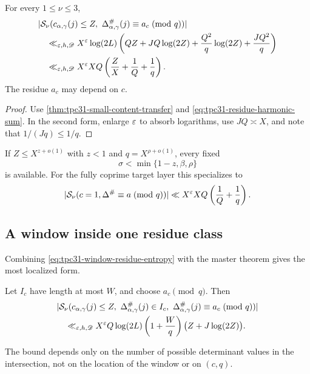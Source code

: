 \begin{corollary}
\label{cor:tpc31-small-residue}
For every $1\le\nu\le3$,
\begin{align}
 &|\mathcal S_\nu(c_{\alpha,\gamma}(j)\le Z,
 \ \Delta^\#_{\alpha,\gamma}(j)
       \equiv a_c\!\pmod q)|
 \notag\\
 &\quad\ll_{\varepsilon,h,\mathscr D}X^\varepsilon\log(2L)
 \left(
 QZ+JQ\log(2Z)
 +\frac{Q^2}q\log(2Z)+\frac{JQ^2}q
 \right)
 \label{eq:tpc31-small-residue-expanded}\\
 &\quad\ll_{\varepsilon,h,\mathscr D}
 X^\varepsilon XQ
 \left(\frac ZX+\frac1Q+\frac1q\right).
 \label{eq:tpc31-small-residue}
\end{align}
The residue $a_c$ may depend on $c$.
\end{corollary}

\begin{proof}
Use \cref{thm:tpc31-small-content-transfer} and
\eqref{eq:tpc31-residue-harmonic-sum}.  In the second form, enlarge
$\varepsilon$ to absorb logarithms, use $JQ\asymp X$, and note that
$1/(Jq)\le1/q$.
\end{proof}

If $Z\le X^{z+o(1)}$ with $z<1$ and
$q=X^{\rho+o(1)}$, every fixed
\begin{equation}
 \sigma<\min\{1-z,\beta,\rho\}
 \label{eq:tpc31-small-residue-saving}
\end{equation}
is available.  For the fully coprime target layer this specializes to
\begin{equation}
 |\mathcal S_\nu(c=1,\Delta^\#\equiv a\!\pmod q)|
 \ll X^\varepsilon XQ\left(\frac1Q+\frac1q\right).
 \label{eq:tpc31-coprime-residue}
\end{equation}

\subsection{A window inside one residue class}

Combining \eqref{eq:tpc31-window-residue-entropy} with the master
theorem gives the most localized form.

\begin{corollary}
\label{cor:tpc31-small-window-residue}
Let $I_c$ have length at most $W$, and choose $a_c\pmod q$.  Then
\begin{align}
 &|\mathcal S_\nu(c_{\alpha,\gamma}(j)\le Z,
 \ \Delta^\#_{\alpha,\gamma}(j)\in I_c,
 \ \Delta^\#_{\alpha,\gamma}(j)\equiv a_c\!\pmod q)|
 \notag\\
 &\quad\ll_{\varepsilon,h,\mathscr D}
 X^\varepsilon Q\log(2L)
 \left(1+\frac Wq\right)
 \bigl(Z+J\log(2Z)\bigr).
 \label{eq:tpc31-small-window-residue}
\end{align}
\end{corollary}

The bound depends only on the number of possible determinant values
in the intersection, not on the location of the window or on
$(c,q)$.

